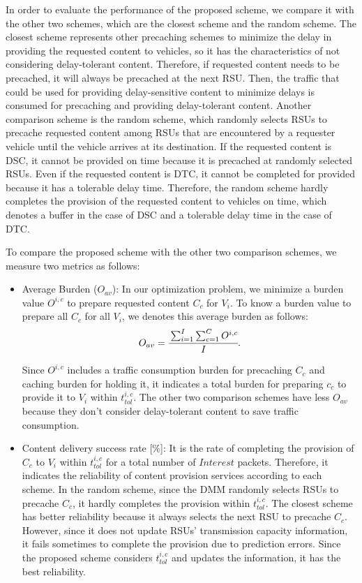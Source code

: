 \documentclass{ieeeaccess}
\begin{document}
In order to evaluate the performance of the proposed scheme, we compare it with the other two schemes, which are the closest scheme and the random scheme.
The closest scheme represents other precaching schemes to minimize the delay in providing the requested content to vehicles, so it has the characteristics of not considering delay-tolerant content.
Therefore, if requested content needs to be precached, it will always be precached at the next RSU.
Then, the traffic that could be used for providing delay-sensitive content to minimize delays is consumed for precaching and providing delay-tolerant content.
Another comparison scheme is the random scheme, which randomly selects RSUs to precache requested content among RSUs that are encountered by a requester vehicle until the vehicle arrives at its destination.
If the requested content is DSC, it cannot be provided on time because it is precached at randomly selected RSUs.
Even if the requested content is DTC, it cannot be completed for provided because it has a tolerable delay time.
Therefore, the random scheme hardly completes the provision of the requested content to vehicles on time, which denotes a buffer in the case of DSC and a tolerable delay time in the case of DTC.


To compare the proposed scheme with the other two comparison schemes, we measure two metrics as follows:
\begin{itemize}
    \item Average Burden ($O_{av}$):
        In our optimization problem, we minimize a burden value $O^{i,c}$ to prepare requested content $C_{c}$ for $V_{i}$.
        To know a burden value to prepare all $C_{c}$ for all $V_{i}$, we denotes this average burden as follows:
        \begin{equation}
            O_{av} = \cfrac{\sum^{I}_{i=1}\sum^{C}_{c=1} O^{i,c}}{I}.
        \end{equation}
        
        Since $O^{i,c}$ includes a traffic consumption burden for precaching $C_{c}$ and caching burden for holding it, it indicates a total burden for preparing $c_{c}$ to provide it to $V_{i}$ within $t_{tol}^{i,c}$.
        The other two comparison schemes have less $O_{av}$ because they don't consider delay-tolerant content to save traffic consumption.
    \item Content delivery success rate [$\%$]:
        It is the rate of completing the provision of $C_{c}$ to $V_{i}$ within $t_{tol}^{i,c}$ for a total number of $Interest$ packets.
        Therefore, it indicates the reliability of content provision services according to each scheme.
        In the random scheme, since the DMM randomly selects RSUs to precache $C_{c}$, it hardly completes the provision within $t_{tol}^{i,c}$.
        The closest scheme has better reliability because it always selects the next RSU to precache $C_{c}$.
        However, since it does not update RSUs' transmission capacity information, it fails sometimes to complete the provision due to prediction errors.
        Since the proposed scheme considers $t_{tol}^{i,c}$ and updates the information, it has the best reliability.    
\end{itemize}
\end{document}
